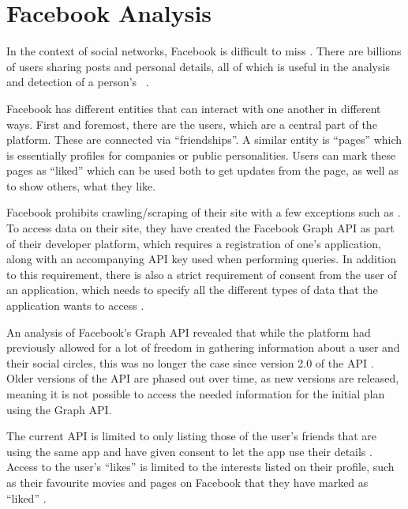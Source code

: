\section{Facebook Analysis}\label{sec:facebook-analysis}
In the context of social networks, Facebook is difficult to miss \citep{FacebookPopularity}.
There are billions of users sharing posts and personal details, all of which is useful in the analysis and
detection of a person's \fb\ .\nl

Facebook has different entities that can interact with one another in different ways.
First and foremost, there are the users, which are a central part of the
platform. These are connected via ``friendships''.
A similar entity is ``pages'' which is essentially profiles for companies or
public personalities.
Users can mark these pages as ``liked'' which can be used both to get updates
from the page, as well as to show others, what they like.\nl

Facebook prohibits crawling/scraping of their site with a few exceptions such as
\citep{FacebookRobotsTxt}.
To access data on their site, they have created the Facebook Graph API as part
of their developer platform, which requires a registration of one's application,
along with an accompanying API key used when performing queries.
In addition to this requirement, there is also a strict requirement of consent
from the user of an application, which needs to specify all the different types
of data that the application wants to access \citep{FacebookGraphApiAccessTokens}.\nl

An analysis of Facebook's Graph API \citep{FacebookGraphApiDocumentation} revealed that while the platform had
previously allowed for a lot of freedom in gathering information about a user
and their social circles, this was no longer the case since version 2.0 of the
API \citep{FacebookChangesInGraphTwoPointOh}.
Older versions of the API are phased out over time, as new versions are released, meaning it is not possible to access
the needed information for the initial plan using the Graph
API.\nl

The current API is limited to only listing those of the user's friends that are using the same app and have given
consent to let the app use their details \citep{FacebookChangesInGraphTwoPointOh}.
Access to the user's ``likes'' is limited to the interests listed on their profile, such as their favourite movies and
pages on Facebook that they have marked as ``liked''
\citep{FacebookGraphApiUserLikes} \citep{FacebookGraphApiUserEdges}.\nl

